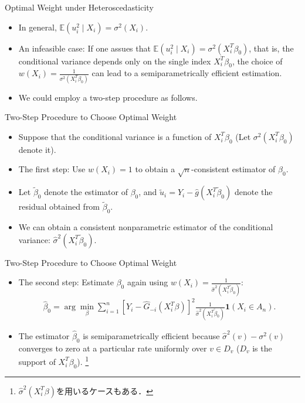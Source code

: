 \documentclass[xcolor=svgnames,dvipdfmx,cjk]{beamer}
\theoremstyle{example}
\def\E{\mathbb{E}}
\begin{document}
  \begin{frame}{Optimal Weight under Heteroscedasticity}
    \begin{itemize}
      \item In general, $\E(u_i^2 \mid X_i) = \sigma^2(X_i)$.
      \item \alert{An infeasible case}: 
            If one assues that  $\E(u_i^2 \mid X_i) = \sigma^2(X_i^{T}\beta_0)$,
            that is, the conditional variance depends only on the single index $X_i^{T}\beta_0$,
            the choice of $w(X_i) = \frac{1}{\sigma^2({X_i^{T}\beta_0})}$ can lead to a semiparametrically efficient estimation.
      \item We could employ a two-step procedure as follows.
    \end{itemize}
  \end{frame}
  
  \begin{frame}{Two-Step Procedure to Choose Optimal Weight}
    \begin{itemize}
      \item Suppose that the conditional variance is a function of $X_i^{T}\beta_0$ (Let $\sigma^2({X_i^{T}\beta_0})$ denote it).
      \item \alert{The first step}: Use $w(X_i)=1$ to obtain a $\sqrt{n}$-consistent estimator of $\beta_0$.
        
      \item Let $\tilde{\beta}_0$ denote the estimator of $\beta_0$, 
            and $\tilde{u}_i = Y_i - \hat{g}(X_i^T \tilde{\beta}_0)$ denote the residual obtained from $\tilde{\beta}_0$.
      \item We can obtain a consistent nonparametric estimator of the conditional variance: $\hat{\sigma}^2({X_i^{T} \tilde{\beta}_0})$.
      \end{itemize}
  \end{frame}

  \begin{frame}{Two-Step Procedure to Choose Optimal Weight}
    \begin{itemize}
      \item \alert{The second step}: Estimate $\beta_0$ again using $w(X_i)= \frac{1}{\hat{\sigma}^2({X_i^{T}\tilde{\beta}_0})}$:
            \begin{align*}
              \hat{\beta}_0 = 
              \arg \min_{\beta} 
              \sum_{i=1}^{n}  
                    \left[ Y_i - \hat{G}_{-i}(X_i^{T}\beta) \right]^2 
                    \frac{1}{\hat{\sigma}^2({X_i^{T}\tilde{\beta}_0})} \mathbf{1}(X_i \in A_n).
            \end{align*}
      \item The estimator $\hat{\beta}_0$ is semiparametrically efficient because
            $\hat{\sigma}^2(v) - \sigma^2(v)$ converges to zero at a particular rate 
            uniformly over $v \in D_v$ ($D_v$ is the support of $X_i^{T}\beta_0$).
            \footnote{$\hat{\sigma}^2({X_i^{T}\beta})$を用いるケースもある．}
    \end{itemize} 
  \end{frame}
\end{document}
